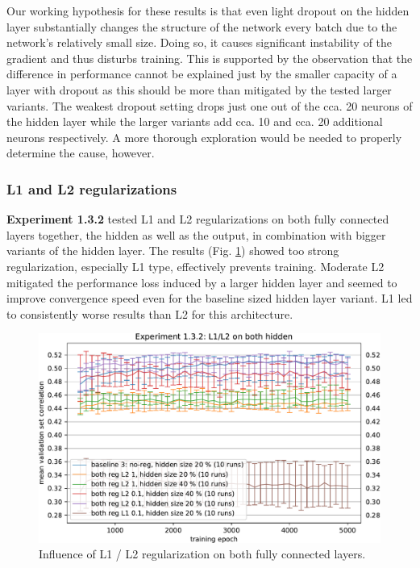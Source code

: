 Our working hypothesis for these results is that even light dropout on the hidden layer substantially changes the structure of the network every batch due to the network’s relatively small size. Doing so, it causes significant instability of the gradient and thus disturbs training. This is supported by the observation that the difference in performance cannot be explained just by the smaller capacity of a layer with dropout as this should be more than mitigated by the tested larger variants. The weakest dropout setting drops just one out of the cca. 20 neurons of the hidden layer while the larger variants add cca. 10 and cca. 20 additional neurons respectively. A more thorough exploration would be needed to properly determine the cause, however.

\subsubsection{L1 and L2 regularizations}\label{ex:1.3.2}

\textbf{Experiment 1.3.2} tested L1 and L2 regularizations on both fully connected layers together, the hidden as well as the output, in combination with bigger variants of the hidden layer. The results (Fig. \ref{fig:5.1.3.2}) showed too strong regularization, especially L1 type, effectively prevents training. Moderate L2 mitigated the performance loss induced by a larger hidden layer and seemed to improve convergence speed even for the baseline sized hidden layer variant. L1 led to consistently worse results than L2 for this architecture.

\begin{figure}[H]
    \centering
    \includegraphics[width=1\textwidth]{../figures/05_1_3_2}
    \caption[Experiment 1.3.2]{Influence of L1 / L2 regularization on both fully connected layers.}
    \label{fig:5.1.3.2}
\end{figure}

